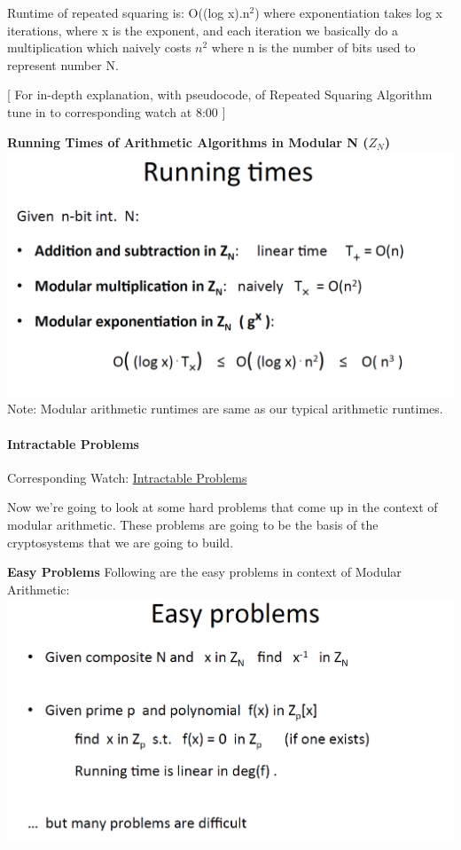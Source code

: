\documentclass[11pt]{article}
\makeatletter
\def\maxwidth{\ifdim\Gin@nat@width>\linewidth\linewidth
    \else\Gin@nat@width\fi}
\let\Oldincludegraphics\includegraphics
\renewcommand{\includegraphics}[1]{\Oldincludegraphics[width=.8\maxwidth]{#1}}
\makeatother
\begin{document}
Runtime of repeated squaring is: O((log x).n\(^{2}\)) where
exponentiation takes log x iterations, where x is the exponent, and each
iteration we basically do a multiplication which naively costs \(n^{2}\)
where n is the number of bits used to represent number N.

{[} For in-depth explanation, with pseudocode, of Repeated Squaring
Algorithm tune in to corresponding watch at 8:00 {]}

\textbf{Running Times of Arithmetic Algorithms in Modular N (\(Z_{N}\))}
\includegraphics{./Images/NT-ModularRuntimes.png} Note: Modular
arithmetic runtimes are same as our typical arithmetic runtimes.

\hypertarget{intractable-problems}{%
\paragraph{Intractable Problems}\label{intractable-problems}}

Corresponding Watch:
\href{https://www.coursera.org/learn/crypto/lecture/EKdgY/intractable-problems}{Intractable
Problems}

Now we're going to look at some hard problems that come up in the
context of modular arithmetic. These problems are going to be the basis
of the cryptosystems that we are going to build.

\textbf{Easy Problems} Following are the easy problems in context of
Modular Arithmetic: \includegraphics{./Images/NT-EasyProbs.png}
\end{document}
